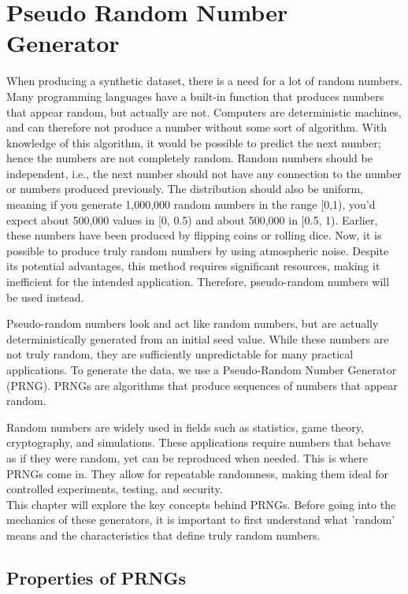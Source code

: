 \section{Pseudo Random Number Generator}

    When producing a synthetic dataset, there is a need for a lot of random numbers. Many programming languages have a built-in function that produces numbers that appear random, but actually are not. Computers are deterministic machines, and can therefore not produce a number without some sort of algorithm. With knowledge of this algorithm, it would be possible to predict the next number; hence the numbers are not completely random. Random numbers should be independent, i.e., the next number should not have any connection to the number or numbers produced previously. The distribution should also be uniform, meaning if you generate 1,000,000 random numbers in the range [0,1), you'd expect about 500,000 values in [0, 0.5) and about 500,000 in [0.5, 1). Earlier, these numbers have been produced by flipping coins or rolling dice. Now, it is possible to produce truly random numbers by using atmospheric noise. Despite its potential advantages, this method requires significant resources, making it inefficient for the intended application. Therefore, pseudo-random numbers will be used instead.

    Pseudo-random numbers look and act like random numbers, but are actually deterministically generated from an initial seed value. While
	these numbers are not truly random, they are sufficiently unpredictable for many practical applications.
	To generate the data, we use a Pseudo-Random Number Generator (PRNG).
	PRNGs are algorithms that produce sequences of numbers that appear random.
	

	Random numbers are widely used in fields such as statistics, game theory, cryptography, and simulations. These applications require numbers that behave
	as if they were random, yet can be reproduced when needed. This is where
	PRNGs come in. They allow for repeatable randomness, making them ideal for
	controlled experiments, testing, and security.
    \\
	This chapter will explore the key concepts behind PRNGs. Before going into the
	mechanics of these generators, it is important to first understand what ’random’
	means and the characteristics that define truly random numbers.
	
	\subsection{Properties of PRNGs}
	
